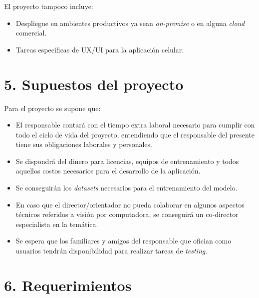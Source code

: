 \documentclass[
11pt, %
]{charter}
\begin{document}
El proyecto tampoco incluye:
\begin{itemize}
\item Despliegue en ambientes productivos ya sean \textit{on-premise} o en alguna \textit{cloud} comercial.
\item Tareas específicas de UX/UI para la aplicación celular. 
\end{itemize}

\section{5. Supuestos del proyecto}
\label{sec:supuestos}
Para el proyecto se supone que:
\begin{itemize}
	\item El responsable contará con el tiempo extra laboral necesario para cumplir con todo el ciclo de vida del proyecto, entendiendo que el responsable del presente tiene sus obligaciones laborales y personales.
	\item Se dispondrá del dinero para licencias, equipos de entrenamiento y todos aquellos costos necesarios para el desarrollo de la aplicación.
	\item Se conseguirán los \textit{datasets} necesarios para el entrenamiento del modelo.
	\item En caso que el director/orientador no pueda colaborar en algunos aspectos técnicos referidos a visión por computadora, se conseguirá un co-director especialista en la temática.
	\item Se espera que los familiares y amigos del responsable que ofician como usuarios tendrán disponibilidad para realizar tareas de \textit{testing}.
\end{itemize}


\section{6. Requerimientos}
\label{sec:requerimientos}
\end{document}

